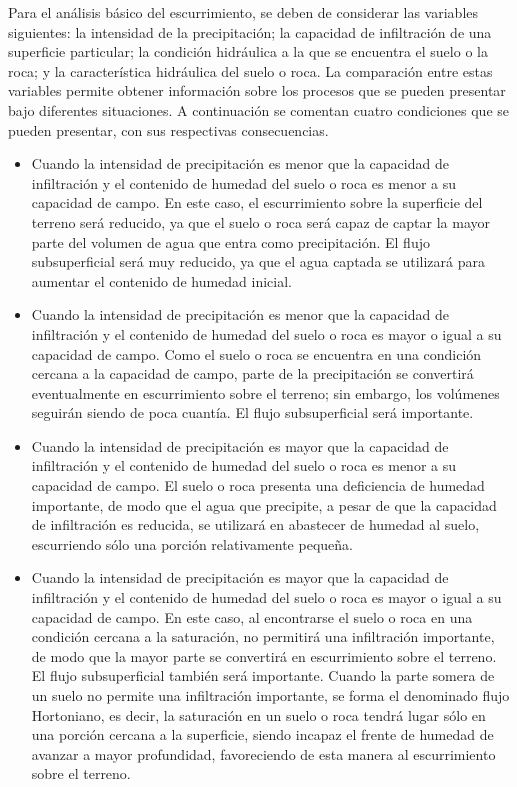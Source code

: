 \documentclass[10pt,a4paper, twoside]{report}
\begin{document}
Para el análisis básico del escurrimiento, se deben de considerar las variables 
siguientes: la intensidad de la precipitación; la capacidad de infiltración de 
una superficie particular; la condición hidráulica a la que se encuentra el 
suelo o la roca; y la característica hidráulica del suelo o roca. 
La comparación entre estas variables permite obtener información sobre los 
procesos que se pueden presentar bajo diferentes situaciones. A 
continuación se comentan cuatro condiciones que se pueden presentar, con 
sus respectivas consecuencias. 

\begin{itemize}
\item Cuando la intensidad de precipitación es menor que la capacidad de 
infiltración y el contenido de humedad del suelo o roca es menor a su 
capacidad de campo. En este caso, el escurrimiento sobre la superficie del 
terreno será reducido, ya que el suelo o roca será capaz de captar la 
mayor parte del volumen de agua que entra como precipitación. El flujo 
subsuperficial será muy reducido, ya que el agua captada se utilizará para 
aumentar el contenido de humedad inicial. 
\item Cuando la intensidad de precipitación es menor que la capacidad de 
infiltración y el contenido de humedad del suelo o roca es mayor o igual a 
su capacidad de campo. Como el suelo o roca se encuentra en una 
condición cercana a la capacidad de campo, parte de la precipitación se 
convertirá eventualmente en escurrimiento sobre el terreno; sin embargo, 
los volúmenes seguirán siendo de poca cuantía. El flujo subsuperficial será 
importante. 
\item Cuando la intensidad de precipitación es mayor que la capacidad de 
infiltración y el contenido de humedad del suelo o roca es menor a su 
capacidad de campo. El suelo o roca presenta una deficiencia de humedad 
importante, de modo que el agua  que precipite, a pesar de que la 
capacidad de infiltración es reducida, se utilizará en abastecer de humedad al 
suelo, escurriendo sólo una porción relativamente pequeña. 
\item Cuando la intensidad de precipitación es mayor que la capacidad de 
infiltración y el contenido de humedad del suelo o roca es mayor o igual a 
su capacidad de campo. En este caso, al encontrarse el suelo o roca en 
una condición cercana a la saturación, no permitirá una infiltración 
importante, de modo que la mayor parte se convertirá en escurrimiento 
sobre el terreno. El flujo subsuperficial también será importante. Cuando 
la parte somera de un suelo no permite una infiltración importante, se 
forma el denominado flujo Hortoniano, es decir, la saturación en un suelo 
o roca tendrá lugar sólo en una porción cercana a la superficie, siendo 
incapaz el frente de humedad  de avanzar a mayor profundidad, 
favoreciendo de esta manera al escurrimiento sobre el terreno.
\end{itemize}
\end{document}
